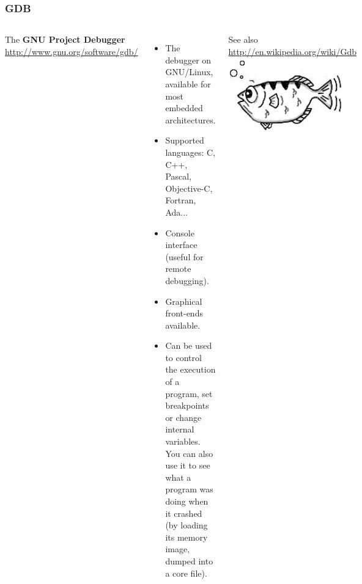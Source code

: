 \begin{frame}
  \frametitle{GDB}
  \fontsize{11}{11}\selectfont
  \begin{columns}[T]
    The {\bf GNU Project Debugger}\\
    \url{http://www.gnu.org/software/gdb/}
    \begin{itemize}
    \item The debugger on GNU/Linux, available for most embedded
      architectures.
    \item Supported languages: C, C++, Pascal, Objective-C, Fortran,
      Ada...
    \item Console interface (useful for remote debugging).
    \item Graphical front-ends available.
    \item Can be used to control the execution of a program, set
      breakpoints or change internal variables. You can also use it to
      see what a program was doing when it crashed (by loading its
      memory image, dumped into a core file).
    \end{itemize}
    See also \url{http://en.wikipedia.org/wiki/Gdb}
    \includegraphics[width=0.9\textwidth]{slides/sysdev-application-development/gdb.png}
  \end{columns}
\end{frame}

